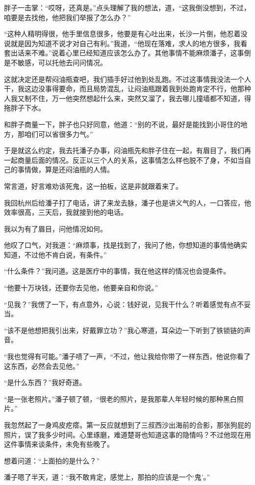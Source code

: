 胖子一击掌：“哎呀，还真是。”点头理解了我的想法，道，“这我倒没想到，不过，咱要是去找他，他把我们举报了怎么办？”

“这种人精明得很，他手里信息很多，他要是有心吐出来，长沙一片倒，他忍着没说就是因为知道不说才对自己有利。”我道，“他现在落难，求人的地方很多，我看套出话来不难。”说着心里已经知道应该怎么办了。其他事情不能麻烦潘子，这事倒是不敏感，可以托他去问问情况。

这就决定还是帮闷油瓶查吧，我们插手好过他到处乱跑。不过这事情我没法一个人干，我这边没事得要命，而且局势混乱，让闷油瓶跟着我到处跑肯定不行，他那种人我又制不住，万一他突然想起什么来，突然又溜了，我去哪儿撞墙都不知道，得拖胖子下水。

和胖子商量一下，胖子也只好同意，他道：“别的不说，最好是能找到小哥住的地方，那咱们可以省很多力气。”

于是就这么约定，我去托潘子办事，闷油瓶先和胖子住在一起，有眉目了，我们再一起商量后面的情况。反正以三个人的关系，这事情怎么样也脱不了身，不如当自己的事情做，算是还闷油瓶的人情。

常言道，好言难劝该死鬼，这一拍板，这是非就跟着来了。

我回杭州后给潘子打了电话，讲了来龙去脉，潘子也是讲义气的人，一口答应，他效率很高，三天后，我就接到他的电话。

我以为有了眉目，问他情况如何。

他叹了口气，对我道：“麻烦事，找是找到了，我问了他，你想知道的事情他确实知道，不过他不肯白说，有条件。”

“什么条件？”我问道。这是医疗中的事情，我在他这样的情况也会提条件。

“他要十万块钱，还要你去见他，他要亲自和你说。”

“见我？”我愣了一下，有点意外，心说：钱好说，见我干什么？听着感觉有点不妥当。

“该不是他想把我引出来，好戴罪立功？”我心寒道，耳朵边一下听到了铁锁链的声音。

“我也觉得有可能。”潘子啧了一声，“不过，他让我给你带了一样东西，他说你看了这东西，必然会去见他。”

“是什么东西？”我好奇道。

“是一张老照片。”潘子顿了顿，“很老的照片，是我那辈人年轻时候的那种黑白照片。”

我忽然起了一身鸡皮疙瘩。第一反应就想到了三叔西沙出海前的合影，那张狗屁的照片，误了我多少时间。心里琢磨，难道楚哥也知道这事的隐情吗？不过他现在用这件事情来谈条件，未免有些晚了。

想着问道：“上面拍的是什么？”

潘子嗯了半天，道：“我不敢肯定，感觉上，那拍的应该是一个‘鬼’。”

